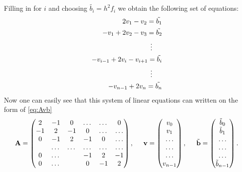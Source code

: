 \documentclass[11pt,a4paper,english,draft]{article}
\numberwithin{equation}{section}
\newcommand{\ve}[1]{\mathbf{#1}} %
\newcommand{\spac}{\hspace{5mm}}
\begin{document}
Filling in for $i$ and choosing $\tilde{b_i} = h^2 f_i$ we obtain the following set of equations: 
\begin{align*}
	2v_{1}-v_{2}=\tilde{b_1} \\
	-v_{1}+2v_{2}-v_{3}=\tilde{b_2} \\
	\vdots \hspace{0.5cm} \\
	-v_{i-1}+2v_{i}-v_{i+1}=\tilde{b_i} \\
	\vdots \hspace{0.5cm}  \\ 
	-v_{n-1}+2v_{n}=\tilde{b_n} \\
\end{align*}
Now one can easily see that this system of linear equations can written on the form of \eqref{eq:Avb}
\begin{gather*}
    \ve{A} = \begin{pmatrix}
                           2& -1& 0 &\dots   & \dots &0 \\
                           -1 & 2 & -1 &0 &\dots &\dots \\
                           0&-1 &2 & -1 & 0 & \dots \\
                           & \dots   & \dots &\dots   &\dots & \dots \\
                           0&\dots   &  &-1 &2& -1 \\
                           0&\dots    &  & 0  &-1 & 2 \\
                      \end{pmatrix},\spac \ve{v} = \begin{pmatrix}
                           v_0\\
                           v_1\\
                           \dots \\
                          \dots  \\
                          \dots \\
                           v_{n-1}\\
                      \end{pmatrix},
  \spac \tilde{\ve{b}} = \begin{pmatrix}
                           \tilde{b}_0\\
                           \tilde{b}_1\\
                           \dots \\
                           \dots \\
                          \dots \\
                           \tilde{b}_{n-1}\\
                      \end{pmatrix}.
\end{gather*}
\end{document}
